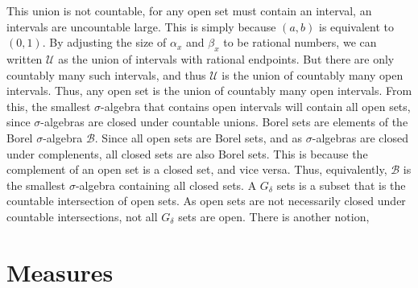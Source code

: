                This union is not countable, for any open set must
                contain an interval, an intervals are uncountable large.
                This is simply because $(a,b)$ is equivalent to $(0,1)$.
                By adjusting the size of $\alpha_{x}$ and $\beta_{x}$ to
                be rational numbers, we can written $\mathcal{U}$ as the
                union of intervals with rational endpoints. But there are
                only countably many such intervals, and thus
                $\mathcal{U}$ is the union of countably many open
                intervals. Thus, any open set is the union of countably
                many open intervals. From this, the smallest
                $\sigma$-algebra that contains open intervals will contain
                all open sets, since $\sigma$-algebras are closed under
                countable unions. Borel sets are elements of the
                Borel $\sigma$-algebra $\mathcal{B}$. Since all open
                sets are Borel sets, and as $\sigma$-algebras are closed
                under complenents, all closed sets are also Borel sets.
                This is because the complement of an open set is a closed
                set, and vice versa. Thus, equivalently, $\mathcal{B}$ is
                the smallest $\sigma$-algebra containing all closed sets.
                A $G_{\delta}$ sets is a subset that is the countable
                intersection of open sets. As open sets are not
                necessarily closed under countable intersections, not
                all $G_{\delta}$ sets are open. There is another notion,
        \section{Measures}
